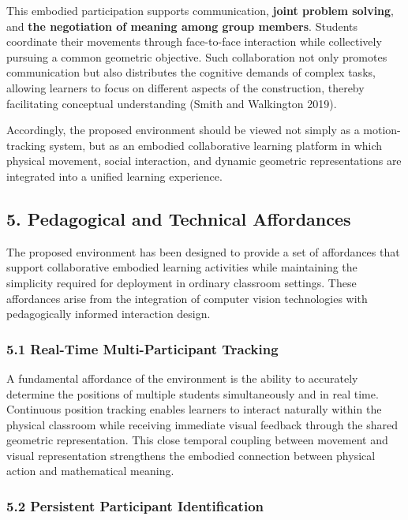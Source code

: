 This embodied participation supports communication, \textbf{joint
problem solving}, and \textbf{the negotiation of meaning among group
members}. Students coordinate their movements through face-to-face
interaction while collectively pursuing a common geometric objective.
Such collaboration not only promotes communication but also distributes
the cognitive demands of complex tasks, allowing learners to focus on
different aspects of the construction, thereby facilitating conceptual
understanding (Smith and Walkington 2019).

Accordingly, the proposed environment should be viewed not simply as a
motion-tracking system, but as an embodied collaborative learning
platform in which physical movement, social interaction, and dynamic
geometric representations are integrated into a unified learning
experience.

\subsection{5. Pedagogical and Technical
Affordances}\label{pedagogical-and-technical-affordances}

The proposed environment has been designed to provide a set of
affordances that support collaborative embodied learning activities
while maintaining the simplicity required for deployment in ordinary
classroom settings. These affordances arise from the integration of
computer vision technologies with pedagogically informed interaction
design.

\subsubsection{5.1 Real-Time Multi-Participant
Tracking}\label{real-time-multi-participant-tracking}

A fundamental affordance of the environment is the ability to accurately
determine the positions of multiple students simultaneously and in real
time. Continuous position tracking enables learners to interact
naturally within the physical classroom while receiving immediate visual
feedback through the shared geometric representation. This close
temporal coupling between movement and visual representation strengthens
the embodied connection between physical action and mathematical
meaning.

\subsubsection{5.2 Persistent Participant
Identification}\label{persistent-participant-identification}

